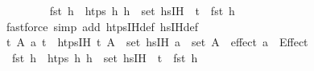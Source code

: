 \begin{isabellebody}
\ \ \ \ \ \ \isamarkupfalse%
\ {}{\isacharparenleft}{\kern0pt}{}{\isacharparenright}{\kern0pt}\ {\isacartoucheopen}fst\ h{}\ {\isasymin}\ htps{\isacartoucheclose}\ {\isacartoucheopen}{\isasymAnd}h{\isacharprime}{\kern0pt}{\isachardot}{\kern0pt}\ h{\isacharprime}{\kern0pt}\ {\isasymin}\ set\ {\isacharparenleft}{\kern0pt}hs{\isacharunderscore}{\kern0pt}IH{\isacharparenright}{\kern0pt}\ {\isasymLongrightarrow}\ t\ {\isasymnoteq}\ fst\ h{\isacharprime}{\kern0pt}{\isacartoucheclose}\isanewline
\ \ \ \ \ \ \isamarkupfalse%
\ {\isacharparenleft}{\kern0pt}fastforce\ simp\ add{\isacharcolon}{\kern0pt}\ htps{\isacharunderscore}{\kern0pt}IH{\isacharunderscore}{\kern0pt}def\ hs{\isacharunderscore}{\kern0pt}IH{\isacharunderscore}{\kern0pt}def{\isacharparenright}{\kern0pt}\isanewline
\ \ \ \ \isamarkupfalse%
\ \isamarkupfalse%
\ {\isachardoublequoteopen}{\isasymAnd}t{\isacharprime}{\kern0pt}{\isacharprime}{\kern0pt}\ A{\isacharprime}{\kern0pt}{\isacharprime}{\kern0pt}\ a{\isachardot}{\kern0pt}\ {\isasymlbrakk}t{\isacharprime}{\kern0pt}{\isacharprime}{\kern0pt}\ {\isasymnotin}\ htps{\isacharunderscore}{\kern0pt}IH{\isacharsemicolon}{\kern0pt}\ {\isacharparenleft}{\kern0pt}t{\isacharprime}{\kern0pt}{\isacharprime}{\kern0pt}{\isacharcomma}{\kern0pt}\ A{\isacharprime}{\kern0pt}{\isacharprime}{\kern0pt}{\isacharparenright}{\kern0pt}\ {\isasymin}\ set\ {\isacharparenleft}{\kern0pt}hs{\isacharprime}{\kern0pt}{\isacharunderscore}{\kern0pt}IH{\isacharparenright}{\kern0pt}{\isacharsemicolon}{\kern0pt}\ a\ {\isasymin}\ set\ A{\isacharprime}{\kern0pt}{\isacharprime}{\kern0pt}{\isasymrbrakk}\ {\isasymLongrightarrow}\ effect\ a\ {\isacharequal}{\kern0pt}\ Effect\ {\isacharbrackleft}{\kern0pt}{\isacharbrackright}{\kern0pt}\ {\isacharbrackleft}{\kern0pt}{\isacharbrackright}{\kern0pt}{\isachardoublequoteclose}\isanewline
\ \ \ \ \ \ \isamarkupfalse%
\ {}{\isacharparenleft}{\kern0pt}{}{}{\isacharparenright}{\kern0pt}\ {\isacartoucheopen}fst\ h{}\ {\isasymin}\ htps{\isacartoucheclose}\ {\isacartoucheopen}{\isasymAnd}h{\isacharprime}{\kern0pt}{\isachardot}{\kern0pt}\ h{\isacharprime}{\kern0pt}\ {\isasymin}\ set\ {\isacharparenleft}{\kern0pt}hs{\isacharprime}{\kern0pt}{\isacharunderscore}{\kern0pt}IH{\isacharparenright}{\kern0pt}\ {\isasymLongrightarrow}\ t{\isacharprime}{\kern0pt}\ {\isasymnoteq}\ fst\ h{\isacharprime}{\kern0pt}{\isacartoucheclose}\isanewline
\ \ \ \ \ \ \isamarkupfalse%

\end{isabellebody}
